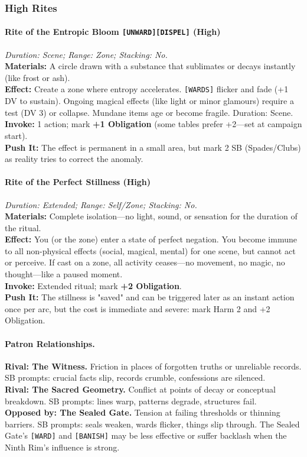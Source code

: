 \subsubsection*{High Rites}

\paragraph{Rite of the Entropic Bloom \texttt{[UNWARD][DISPEL]} (High)}
\emph{Duration: Scene; Range: Zone; Stacking: No.}\\
\textbf{Materials:} A circle drawn with a substance that sublimates or decays instantly (like frost or ash).\\
\textbf{Effect:} Create a zone where entropy accelerates. \texttt{[WARDS]} flicker and fade (+1 DV to sustain). Ongoing magical effects (like light or minor glamours) require a test (DV 3) or collapse. Mundane items age or become fragile. Duration: Scene.\\
\textbf{Invoke:} 1 action; mark \textbf{+1 Obligation} (some tables prefer +2—set at campaign start).\\
\textbf{Push It:} The effect is permanent in a small area, but mark 2 SB (Spades/Clubs) as reality tries to correct the anomaly.

\paragraph{Rite of the Perfect Stillness (High)}
\emph{Duration: Extended; Range: Self/Zone; Stacking: No.}\\
\textbf{Materials:} Complete isolation—no light, sound, or sensation for the duration of the ritual.\\
\textbf{Effect:} You (or the zone) enter a state of perfect negation. You become immune to all non-physical effects (social, magical, mental) for one scene, but cannot act or perceive. If cast on a zone, all activity ceases—no movement, no magic, no thought—like a paused moment.\\
\textbf{Invoke:} Extended ritual; mark \textbf{+2 Obligation}.\\
\textbf{Push It:} The stillness is "saved" and can be triggered later as an instant action once per arc, but the cost is immediate and severe: mark Harm 2 and +2 Obligation.

\paragraph{Patron Relationships.}
\textbf{Rival: The Witness.} Friction in places of forgotten truths or unreliable records. SB prompts: crucial facts slip, records crumble, confessions are silenced.\\
\textbf{Rival: The Sacred Geometry.} Conflict at points of decay or conceptual breakdown. SB prompts: lines warp, patterns degrade, structures fail.\\
\textbf{Opposed by: The Sealed Gate.} Tension at failing thresholds or thinning barriers. SB prompts: seals weaken, wards flicker, things slip through. The Sealed Gate's \texttt{[WARD]} and \texttt{[BANISH]} may be less effective or suffer backlash when the Ninth Rim's influence is strong.


